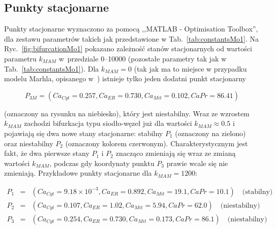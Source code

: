 \FloatBarrier
\subsection{Punkty stacjonarne}
\label{ss:steadystatesMo1}

Punkty stacjonarne wyznaczono za pomocą ,,MATLAB - Optimisation Toolbox'', dla zestawu parametrów takich jak przedstawione w Tab.~\ref{tab:constantsMo1}. Na Ryc.~\ref{fig:bifurcationMo1} pokazano zależność stanów stacjonarnych od wartości parametru $k_{MAM}$ w~przedziale 0--10000 (pozostałe parametry tak jak w Tab.~\ref{tab:constantsMo1}). Dla $k_{MAM}=0$ (tak jak ma to miejsce w przypadku modelu Marhla, opisanego w~\cite{Marhl2000}) istnieje tylko jeden dodatni punkt stacjonarny

\[P_{3M} = (Ca_{Cyt} = 0.257, Ca_{ER} = 0.730, Ca_{Mit} = 0.102,  CaPr = 86.41)\]

\noindent (oznaczony na rysunku na niebiesko), który jest niestabilny. Wraz ze wzrostem $k_{MAM}$ zachodzi bifurkacja typu siodło-węzeł już dla wartości $k_{MAM} \approx 0.5$ i pojawiają się dwa nowe stany stacjonarne: stabilny $P_1$ (oznaczony na zielono) oraz niestabilny $P_2$ (oznaczony kolorem czerwonym). Charakterystycznym jest fakt, że dwa pierwsze stany $P_1$ i $P_2$ znacząco zmieniają się wraz ze zmianą wartości $k_{MAM}$, podczas gdy koordynaty punktu $P_3$ prawie wcale się nie zmieniają. Przykładowe punkty stacjonarne dla  $k_{MAM} = 1200$: 

\begin{eqnarray*}
	P_1 &=& (Ca_{Cyt} = 9.18 \times 10^{-3}, Ca_{ER} = 0.892, Ca_{Mit} = 19.1, CaPr = 10.1) \quad \textrm{(stabilny)}\\
	P_2 &=& (Ca_{Cyt} = 0.107, Ca_{ER} = 1.02, Ca_{Mit} = 5.94, CaPr = 62.0) \quad \textrm{(niestabilny)}\\
	P_3 &=& (Ca_{Cyt} = 0.254, Ca_{ER} = 0.730, Ca_{Mit} = 0.173, CaPr = 86.1) \quad \textrm{(niestabilny)}
\end{eqnarray*}



